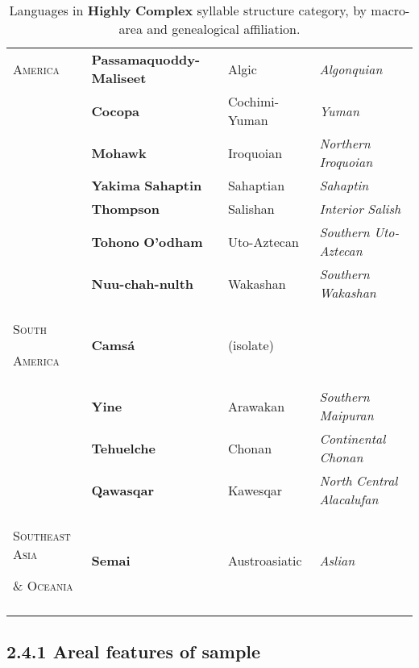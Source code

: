 \begin{table}
\begin{tabularx}{\textwidth}{XXXX}
\textsc{America} & \textbf{Passamaquoddy-Maliseet} & Algic & \textit{Algonquian}\\
\hhline{-~~~} & \textbf{Cocopa} & Cochimi-Yuman & \textit{Yuman}\\
& \textbf{Mohawk} & Iroquoian & \textit{Northern} \textit{Iroquoian}\\
& \textbf{Yakima} \textbf{Sahaptin} & Sahaptian & \textit{Sahaptin}\\
& \textbf{Thompson} & Salishan & \textit{Interior} \textit{Salish}\\
& \textbf{Tohono} \textbf{O’odham} & Uto-Aztecan & \textit{Southern} \textit{Uto-Aztecan}\\
& \textbf{Nuu-chah-nulth} & Wakashan & \textit{Southern} \textit{Wakashan}\\
\textsc{South} 

\textsc{America} & \textbf{Camsá} & (isolate) & \\
\hhline{-~~~} & \textbf{Yine} & Arawakan & \textit{Southern} \textit{Maipuran}\\
& \textbf{Tehuelche} & Chonan & \textit{Continental} \textit{Chonan}\\
& \textbf{Qawasqar} & Kawesqar & \textit{North} \textit{Central} \textit{Alacalufan}\\
\textsc{Southeast} \textsc{Asia} 

\textsc{\&} \textsc{Oceania} & \textbf{Semai} & Austroasiatic & \textit{Aslian}\\
\lspbottomrule
\end{tabularx}
\caption{\label{2.7}Languages in \textbf{Highly} \textbf{Complex} syllable structure category, by macro-area and genealogical affiliation.}
\end{table}



\subsection{2.4.1 Areal features of sample}

